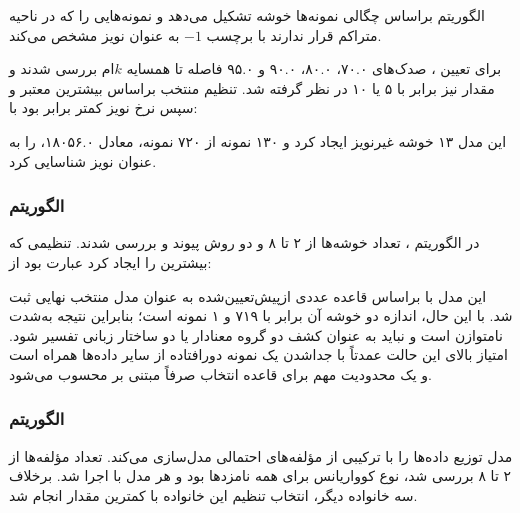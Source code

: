 \documentclass[12pt,a4paper,oneside]{report}
\begin{document}
الگوریتم  براساس چگالی نمونه‌ها خوشه تشکیل می‌دهد و نمونه‌هایی
را که در ناحیه متراکم قرار ندارند با برچسب $-1$ به عنوان نویز مشخص می‌کند.

برای تعیین ، صدک‌های ۷۰.۰، ۸۰.۰، ۹۰.۰ و ۹۵.۰ فاصله تا
همسایه $k$ام بررسی شدند و مقدار  نیز برابر با ۵
یا ۱۰ در نظر گرفته شد. تنظیم منتخب براساس بیشترین  معتبر و
سپس نرخ نویز کمتر برابر بود با:

\begin{center}
\end{center}

این مدل ۱۳ خوشه غیرنویز ایجاد کرد و ۱۳۰ نمونه از ۷۲۰ نمونه، معادل
۱۸۰۵۶.۰، را به عنوان نویز شناسایی کرد.


\subsubsection{الگوریتم }

در الگوریتم ، تعداد خوشه‌ها از ۲ تا ۸ و دو
روش پیوند  و  بررسی شدند. تنظیمی که بیشترین
 را ایجاد کرد عبارت بود از:

\begin{center}
\end{center}

این مدل با  براساس قاعده عددی ازپیش‌تعیین‌شده به
عنوان مدل منتخب نهایی ثبت شد. با این حال، اندازه دو خوشه آن برابر با ۷۱۹ و
۱ نمونه است؛ بنابراین نتیجه به‌شدت نامتوازن است و نباید به عنوان کشف دو
گروه معنادار یا دو ساختار زبانی تفسیر شود. امتیاز بالای این حالت عمدتاً با
جداشدن یک نمونه دورافتاده از سایر داده‌ها همراه است و یک محدودیت مهم برای
قاعده انتخاب صرفاً مبتنی بر  محسوب می‌شود.


\subsubsection{الگوریتم }

مدل  توزیع داده‌ها را با ترکیبی از مؤلفه‌های
احتمالی مدل‌سازی می‌کند. تعداد مؤلفه‌ها از ۲ تا ۸ بررسی شد، نوع کوواریانس
برای همه نامزدها  بود و هر مدل با
 اجرا شد. برخلاف سه خانواده دیگر، انتخاب تنظیم این
خانواده با کمترین مقدار  انجام شد.
\end{document}
